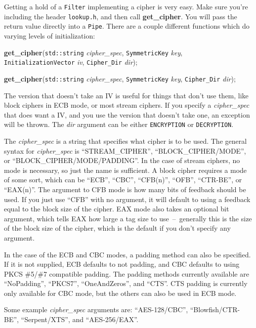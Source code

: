 \documentclass{article}
\newcommand{\filename}[1]{\texttt{#1}}
\newcommand{\function}[1]{\textbf{#1}}
\newcommand{\type}[1]{\texttt{#1}}
\renewcommand{\arg}[1]{\textsl{#1}}
\begin{document}
Getting a hold of a \type{Filter} implementing a cipher is very
easy. Make sure you're including the header \filename{lookup.h}, and
then call \function{get\_cipher}. You will pass the return value
directly into a \type{Pipe}. There are a couple different functions
which do varying levels of initialization:

\function{get\_cipher}(\type{std::string} \arg{cipher\_spec},
                       \type{SymmetricKey} \arg{key},
                       \type{InitializationVector} \arg{iv},
                       \type{Cipher\_Dir} \arg{dir});

\function{get\_cipher}(\type{std::string} \arg{cipher\_spec},
                       \type{SymmetricKey} \arg{key},
                       \type{Cipher\_Dir} \arg{dir});

The version that doesn't take an IV is useful for things that don't
use them, like block ciphers in ECB mode, or most stream ciphers. If
you specify a \arg{cipher\_spec} that does want a IV, and you use the
version that doesn't take one, an exception will be thrown. The
\arg{dir} argument can be either \type{ENCRYPTION} or
\type{DECRYPTION}.

The \arg{cipher\_spec} is a string that specifies what cipher is to be
used. The general syntax for \arg{cipher\_spec} is ``STREAM\_CIPHER'',
``BLOCK\_CIPHER/MODE'', or ``BLOCK\_CIPHER/MODE/PADDING''. In the case
of stream ciphers, no mode is necessary, so just the name is
sufficient. A block cipher requires a mode of some sort, which can be
``ECB'', ``CBC'', ``CFB(n)'', ``OFB'', ``CTR-BE'', or ``EAX(n)''. The
argument to CFB mode is how many bits of feedback should be used. If
you just use ``CFB'' with no argument, it will default to using a
feedback equal to the block size of the cipher. EAX mode also takes an
optional bit argument, which tells EAX how large a tag size to
use~--~generally this is the size of the block size of the cipher,
which is the default if you don't specify any argument.

In the case of the ECB and CBC modes, a padding method can also be
specified. If it is not supplied, ECB defaults to not padding, and CBC
defaults to using PKCS \#5/\#7 compatible padding. The padding methods
currently available are ``NoPadding'', ``PKCS7'', ``OneAndZeros'', and
``CTS''. CTS padding is currently only available for CBC mode, but the
others can also be used in ECB mode.

Some example \arg{cipher\_spec} arguments are: ``AES-128/CBC'',
``Blowfish/CTR-BE'', ``Serpent/XTS'', and ``AES-256/EAX''.
\end{document}
